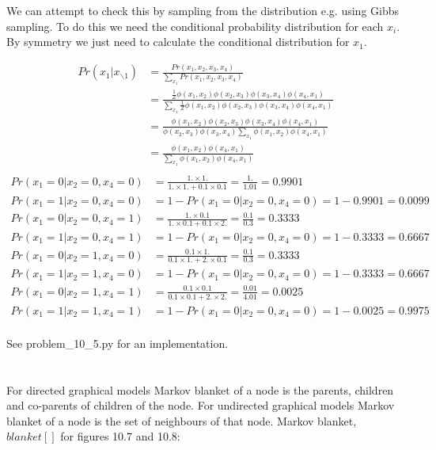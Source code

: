 \documentclass[11pt]{report}
\begin{document}
We can attempt to check this by sampling from the distribution e.g. using Gibbs sampling. To do this we need the conditional probability distribution for each $x_i$. By symmetry we just need to calculate the conditional distribution for $x_1$.

\begin{align*}
  Pr(x_1 | x_{\backslash 1}) &= \frac{Pr(x_1, x_2, x_3, x_4)}{\sum_{x_1} Pr(x_1, x_2, x_3, x_4)} \\
     &= \frac{\frac{1}{Z} \phi(x_1, x_2) \phi(x_2, x_3) \phi(x_3, x_4) \phi(x_4, x_1)}
         {\sum_{x_1}  \frac{1}{Z} \phi(x_1, x_2) \phi(x_2, x_3) \phi(x_3, x_4) \phi(x_4, x_1)} \\
     &= \frac{\phi(x_1, x_2) \phi(x_2, x_3) \phi(x_3, x_4) \phi(x_4, x_1)}
     	{\phi(x_2, x_3) \phi(x_3, x_4) \sum_{x_1} \phi(x_1, x_2) \phi(x_4, x_1)} \\
     &= \frac {\phi(x_1, x_2) \phi(x_4, x_1)}{\sum_{x_1} \phi(x_1, x_2) \phi(x_4, x_1)} \\
 \end{align*}
 \begin{align*}
  Pr(x_1 = 0 | x_2 = 0, x_4 = 0) &= \frac{1. \times 1.}{1. \times 1. + 0.1 \times 0.1} = \frac{1.}{1.01} = 0.9901 \\
  Pr(x_1 = 1 | x_2 = 0, x_4 = 0) &= 1 - Pr(x_1 = 0 | x_2 = 0, x_4 = 0) = 1 - 0.9901 = 0.0099 \\
  Pr(x_1 = 0 | x_2 = 0, x_4 = 1) &= \frac{1. \times 0.1}{1. \times 0.1 + 0.1 \times 2.} = \frac{0.1}{0.3} = 0.3333 \\
  Pr(x_1 = 1 | x_2 = 0, x_4 = 1) &= 1 - Pr(x_1 = 0 | x_2 = 0, x_4 = 0) = 1 - 0.3333 = 0.6667 \\
  Pr(x_1 = 0 | x_2 = 1, x_4 = 0) &= \frac{0.1 \times 1.}{0.1 \times 1. + 2. \times 0.1} = \frac{0.1}{0.3} = 0.3333 \\
  Pr(x_1 = 1 | x_2 = 1, x_4 = 0) &= 1 - Pr(x_1 = 0 | x_2 = 0, x_4 = 0) = 1 - 0.3333 = 0.6667 \\
  Pr(x_1 = 0 | x_2 = 1, x_4 = 1) &= \frac{0.1 \times 0.1}{0.1 \times 0.1 + 2. \times 2.} = \frac{0.01}{4.01} = 0.0025 \\
  Pr(x_1 = 1 | x_2 = 1, x_4 = 1) &= 1 - Pr(x_1 = 0 | x_2 = 0, x_4 = 0) = 1 - 0.0025 = 0.9975 \\
\end{align*}

See problem\_10\_5.py for an implementation.

\section{}
For directed graphical models Markov blanket of a node is the parents, children and co-parents of children of the node. For undirected graphical models Markov blanket of a node is the set of neighbours of that node. Markov blanket, $blanket[]$ for figures 10.7 and 10.8:
\end{document}
